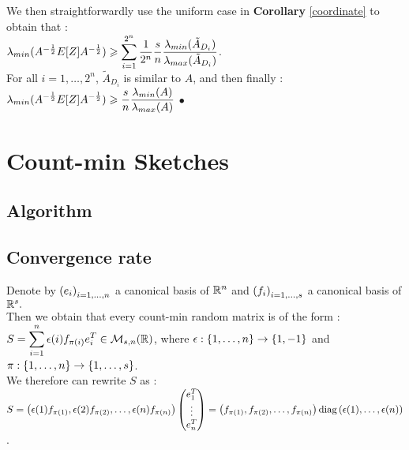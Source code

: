 We then straightforwardly use the uniform case in \textbf{Corollary} \ref{coordinate} to obtain that :\\

$\lambda_{min}(A^{-\frac12}E[Z]A^{-\frac12}) \geqslant  \displaystyle\sum\limits_{i=1}^{2^{n}} \frac{1}{ 2^{n}} \frac{s}{n} \frac{\lambda_{min}(\tilde{A}_{D_{i}})}{\lambda_{max}(\tilde{A}_{D_{i}})}$.\\
For all $i = 1,\dots, 2^{n}$, $\tilde{A}_{D_{i}}$ is similar to $A$, and then finally :\\

$\displaystyle \lambda_{min}(A^{-\frac12}E[Z]A^{-\frac12}) \geqslant \frac{s}{n} \frac{\lambda_{min}(A)}{\lambda_{max}(A)}$ $\bullet$




\chapter{Count-min Sketches}

%
%
%

\section{Algorithm}


\section{Convergence rate}

Denote by $\left(e_{i}\right)_{i=1,\dots,n}$ a canonical basis of ${\mathbb R}^{n}$  and $\left(f_{i}\right)_{i=1,\dots,s}$ a canonical basis of ${\mathbb R}^{s}.$\\ 
Then we obtain that every count-min random matrix is of the form : \\
$\displaystyle S = \displaystyle\sum_{i=1}^{n} \displaystyle\epsilon(i) f_{\pi(i)}e_{i}^{T} \in {\mathcal M}_{s,n}({\mathbb R})$, where $\epsilon : \left\{1,\dots,n\right\} \rightarrow \left\{1,-1\right\}$ and $\pi : \left\{1,\dots,n\right\} \rightarrow \left\{1,\dots,s\right\} $.\\

We therefore can rewrite $S$ as :\\
 $S = \left( \epsilon(1)f_{\pi(1)},\epsilon(2)f_{\pi(2)},\dots,\epsilon(n)f_{\pi(n)} \right) \begin{pmatrix} e_{1}^{T} \\ \vdots \\ e_{n}^{T} \end{pmatrix} = \left( f_{\pi(1)}, f_{\pi(2)},\dots, f_{\pi(n)} \right) \text{diag}\left(\epsilon(1),\dots,\epsilon(n)\right)$.\\
 

